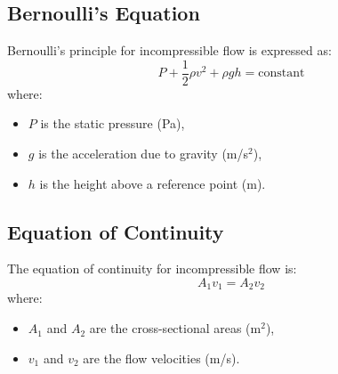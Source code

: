 \documentclass{article}
\begin{document}
\subsection{Bernoulli's Equation}
Bernoulli's principle for incompressible flow is expressed as:
\begin{equation}
    P + \frac{1}{2} \rho v^2 + \rho g h = \text{constant}
\end{equation}
where:
\begin{itemize}
    \item $P$ is the static pressure (Pa),
    \item $g$ is the acceleration due to gravity (m/s\(^2\)),
    \item $h$ is the height above a reference point (m).
\end{itemize}

\subsection{Equation of Continuity}
The equation of continuity for incompressible flow is:
\begin{equation}
    A_1 v_1 = A_2 v_2
\end{equation}
where:
\begin{itemize}
    \item $A_1$ and $A_2$ are the cross-sectional areas (m\(^2\)),
    \item $v_1$ and $v_2$ are the flow velocities (m/s).
\end{itemize}
\end{document}
